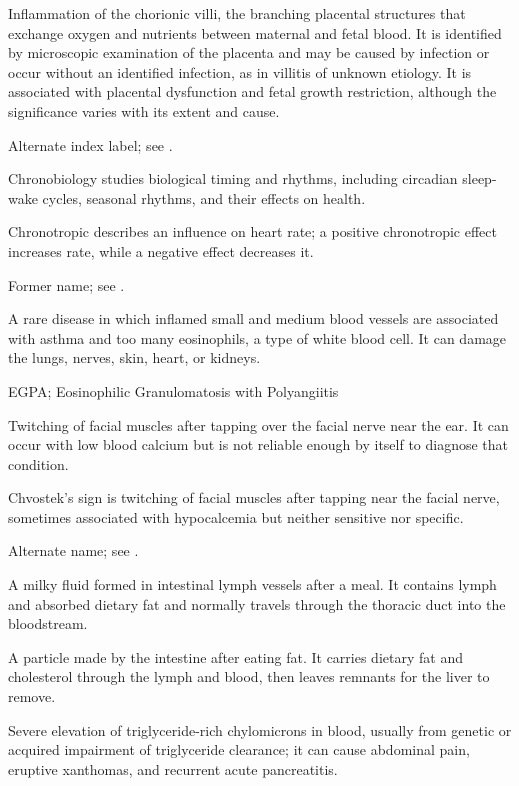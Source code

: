  Inflammation of the chorionic villi, the branching placental structures
that exchange oxygen and nutrients between maternal and fetal blood. It is identified by
microscopic examination of the placenta and may be caused by infection or occur without an
identified infection, as in villitis of unknown etiology. It is associated with placental dysfunction
and fetal growth restriction, although the significance varies with its extent and cause.

 Alternate index label; see .

 Chronobiology studies biological timing and rhythms, including circadian sleep-wake cycles, seasonal rhythms, and their effects on health.

 Chronotropic describes an influence on heart rate; a positive chronotropic effect increases rate, while a negative effect decreases it.

 Former name; see .

 A rare disease in which inflamed small and medium blood vessels are associated with asthma and too many eosinophils, a type of white blood cell. It can damage the lungs, nerves, skin, heart, or kidneys.

\synonyms
EGPA; Eosinophilic Granulomatosis with Polyangiitis

 Twitching of facial muscles after tapping over the facial nerve near the ear. It can occur with low blood calcium but is not reliable enough by itself to diagnose that condition.

 Chvostek’s sign is twitching of facial muscles after tapping near the facial nerve, sometimes associated with hypocalcemia but neither sensitive nor specific.

 Alternate name; see .

 A milky fluid formed in intestinal lymph vessels after a meal. It contains lymph and absorbed dietary fat and normally travels through the thoracic duct into the bloodstream.

 A particle made by the intestine after eating fat. It carries dietary fat and cholesterol through the lymph and blood, then leaves remnants for the liver to remove.

 Severe elevation of triglyceride-rich chylomicrons in blood, usually from genetic or acquired impairment of triglyceride clearance; it can cause abdominal pain, eruptive xanthomas, and recurrent acute pancreatitis.

